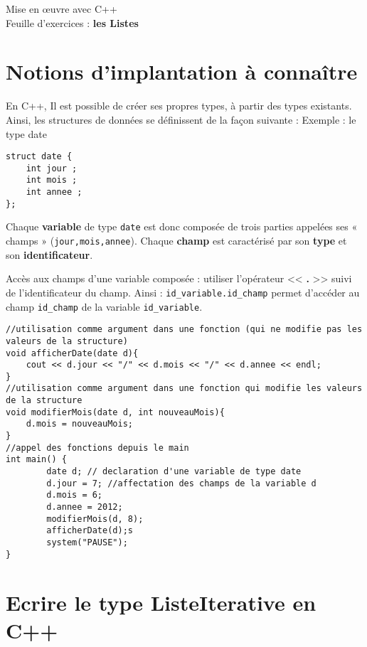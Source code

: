 \documentclass[french]{article}
\begin{document}
	
	\begin{minipage}{\textwidth}
\begin{center}

{\Large Mise en œuvre avec C++ \\ Feuille d'exercices : \textbf{les Listes}}
\end{center}
	\end{minipage}
	
	\section*{Notions d'implantation à connaître}
	En C++, Il est possible de créer ses propres types, à partir des types existants.
	Ainsi, les structures de données se définissent de la façon suivante :
	Exemple : le type date
	
	\begin{lstlisting}[caption={le type \textbf{date}}]
struct date {
	int jour ; 
	int mois ; 
	int annee ;
};
	\end{lstlisting}
	
	Chaque \textbf{variable} de type \texttt{date} est donc composée de trois parties appelées ses « champs » (\texttt{jour,mois,annee}). Chaque \textbf{champ} est caractérisé par son \textbf{type} et son \textbf{identificateur}.
	
	Accès aux champs d'une variable composée : utiliser l’opérateur << \textbf{.} >> suivi de l’identificateur du champ. Ainsi : \texttt{id\_variable.id\_champ} permet d’accéder au champ \texttt{id\_champ} de la variable \texttt{id\_variable}.
	\begin{lstlisting}[caption={Utilisation du type date}]
//utilisation comme argument dans une fonction (qui ne modifie pas les valeurs de la structure)
void afficherDate(date d){
    cout << d.jour << "/" << d.mois << "/" << d.annee << endl;
}
//utilisation comme argument dans une fonction qui modifie les valeurs de la structure
void modifierMois(date d, int nouveauMois){
    d.mois = nouveauMois;
}
//appel des fonctions depuis le main
int main() {
    	date d; // declaration d'une variable de type date
    	d.jour = 7; //affectation des champs de la variable d
    	d.mois = 6;
    	d.annee = 2012;
    	modifierMois(d, 8); 
    	afficherDate(d);s
    	system("PAUSE");
}
	\end{lstlisting}
	
	\section{Ecrire le type ListeIterative en C++}
\end{document}
